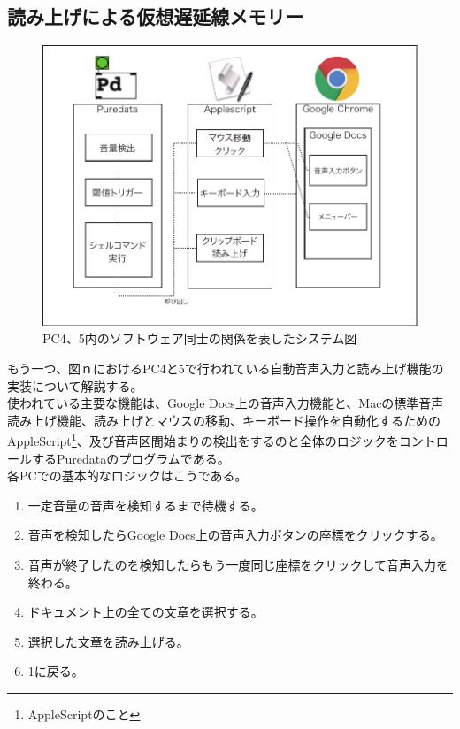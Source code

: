 \documentclass[a4paper,report]{jsbook}
\begin{document}
\subsection{読み上げによる仮想遅延線メモリー}\label{ux8aadux307fux4e0aux3052ux306bux3088ux308bux4eeeux60f3ux9045ux5ef6ux7ddaux30e1ux30e2ux30eaux30fc}

\begin{no-prefix-figure-caption}

\begin{figure}[htbp]
\centering
\includegraphics[width=1.00000\textwidth]{./img/yomiage_diagram.pdf}
\caption{PC4、5内のソフトウェア同士の関係を表したシステム図}
\end{figure}

\end{no-prefix-figure-caption}

もう一つ、図ｎにおけるPC4と5で行われている自動音声入力と読み上げ機能の実装について解説する。\\
使われている主要な機能は、Google
Docs上の音声入力機能と、Macの標準音声読み上げ機能、読み上げとマウスの移動、キーボード操作を自動化するためのAppleScript\footnote{AppleScriptのこと}、及び音声区間始まりの検出をするのと全体のロジックをコントロールするPuredataのプログラムである。\\
各PCでの基本的なロジックはこうである。

\begin{enumerate}
\def\labelenumi{\arabic{enumi}.}
\tightlist
\item
  一定音量の音声を検知するまで待機する。
\item
  音声を検知したらGoogle Docs上の音声入力ボタンの座標をクリックする。
\item
  音声が終了したのを検知したらもう一度同じ座標をクリックして音声入力を終わる。
\item
  ドキュメント上の全ての文章を選択する。
\item
  選択した文章を読み上げる。
\item
  1に戻る。
\end{enumerate}
\end{document}
